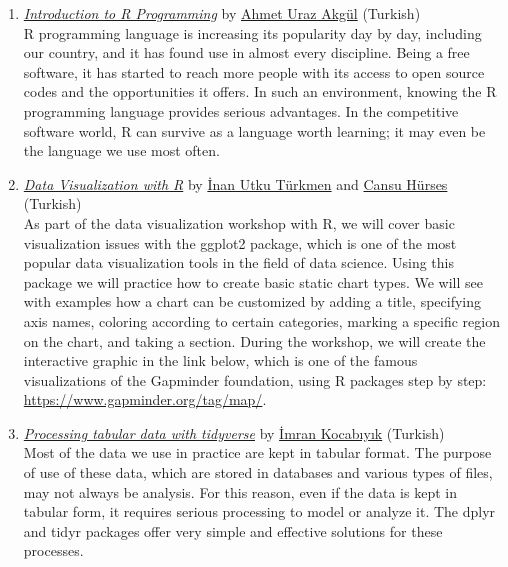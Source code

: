 \begin{enumerate}
    \item \textit{\href{https://www.youtube.com/watch?v=jZTTjVNQRys}{Introduction to R Programming}} by \href{https://twitter.com/rpydaneogrendim}{Ahmet Uraz Akgül} (Turkish)\\ R programming language is increasing its popularity day by day, including our country, and it has found use in almost every discipline. Being a free software, it has started to reach more people with its access to open source codes and the opportunities it offers. In such an environment, knowing the R programming language provides serious advantages. In the competitive software world, R can survive as a language worth learning; it may even be the language we use most often.\\
    
    \item \textit{\href{https://www.youtube.com/watch?v=cY8bBMKVizs}{Data Visualization with R}} by \href{https://www.linkedin.com/in/inan-utku-turkmen/}{İnan Utku Türkmen} and \href{https://www.linkedin.com/in/cansu-h\%C3\%BCrses-7b7462176/}{Cansu Hürses} (Turkish)\\ As part of the data visualization workshop with R, we will cover basic visualization issues with the ggplot2 \citep{ggplot2} package, which is one of the most popular data visualization tools in the field of data science. Using this package we will practice how to create basic static chart types. We will see with examples how a chart can be customized by adding a title, specifying axis names, coloring according to certain categories, marking a specific region on the chart, and taking a section. During the workshop, we will create the interactive graphic in the link below, which is one of the famous visualizations of the Gapminder foundation, using R packages step by step: \url{https://www.gapminder.org/tag/map/}.\\
    
    \item \textit{\href{https://www.youtube.com/watch?v=SzhnjbsFe4o}{Processing tabular data with tidyverse}} by \href{https://www.linkedin.com/in/imrankocabiyik/}{İmran Kocabıyık} (Turkish)\\ Most of the data we use in practice are kept in tabular format. The purpose of use of these data, which are stored in databases and various types of files, may not always be analysis. For this reason, even if the data is kept in tabular form, it requires serious processing to model or analyze it. The dplyr \citep{dplyr} and tidyr \citep{tidyr} packages offer very simple and effective solutions for these processes.\\
    

\end{enumerate}
